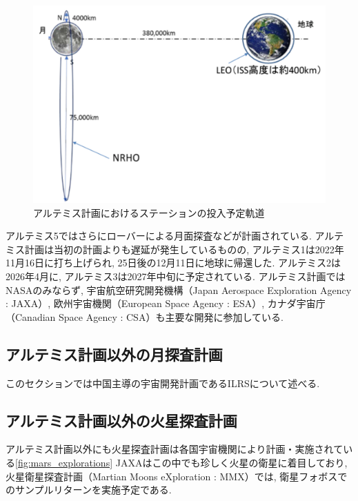 \begin{figure}[tbh]
    \centering
    \includegraphics[width=0.7\textheight]{img/artemis_moon_station_orbit.pdf}
    \caption{アルテミス計画におけるステーションの投入予定軌道}
    \label{fig:artemis_moon_station_orbit}
    \begin{minipage}{\textwidth}
        \raggedright
    \end{minipage}
\end{figure}

アルテミス5ではさらにローバーによる月面探査などが計画されている. 
アルテミス計画は当初の計画よりも遅延が発生しているものの, 
アルテミス1は2022年11月16日に打ち上げられ, 25日後の12月11日に地球に帰還した. 
アルテミス2は2026年4月に, アルテミス3は2027年中旬に予定されている. 
アルテミス計画ではNASAのみならず, 
宇宙航空研究開発機構（Japan Aerospace Exploration Agency : JAXA）, 
欧州宇宙機関（European Space Agency : ESA）, 
カナダ宇宙庁（Canadian Space Agency : CSA）も主要な開発に参加している. 
\cite{jaxa2021}

\subsection{アルテミス計画以外の月探査計画}
\label{subsection:その他の月・火星探査計画}
このセクションでは中国主導の宇宙開発計画であるILRSについて述べる. 

\subsection{アルテミス計画以外の火星探査計画}
\label{subsection:アルテミス計画以外の火星探査計画}
アルテミス計画以外にも火星探査計画は各国宇宙機関により計画・実施されている\ref{fig:mars_explorations}
JAXAはこの中でも珍しく火星の衛星に着目しており, 
火星衛星探査計画（Martian Moons eXploration : MMX）では, 
衛星フォボスでのサンプルリターンを実施予定である. 

